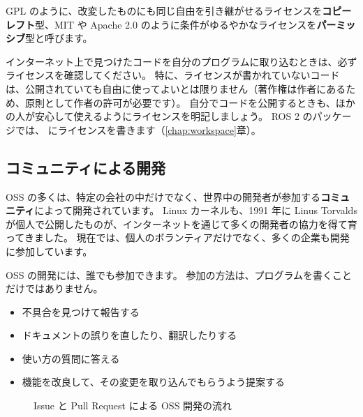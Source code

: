 GPL のように、改変したものにも同じ自由を引き継がせるライセンスを\textbf{コピーレフト}型、MIT や Apache 2.0 のように条件がゆるやかなライセンスを\textbf{パーミッシブ}型と呼びます。

\begin{caution}[他人のコードを使うときはライセンスを確認する]
  インターネット上で見つけたコードを自分のプログラムに取り込むときは、必ずライセンスを確認してください。
  特に、ライセンスが書かれていないコードは、公開されていても自由に使ってよいとは限りません（著作権は作者にあるため、原則として作者の許可が必要です）。
  自分でコードを公開するときも、ほかの人が安心して使えるようにライセンスを明記しましょう。
  ROS 2 のパッケージでは、 にライセンスを書きます（\ref{chap:workspace}章）。
\end{caution}

\subsection{コミュニティによる開発}

OSS の多くは、特定の会社の中だけでなく、世界中の開発者が参加する\textbf{コミュニティ}によって開発されています。
Linux カーネルも、1991 年に Linus Torvalds が個人で公開したものが、インターネットを通じて多くの開発者の協力を得て育ってきました。
現在では、個人のボランティアだけでなく、多くの企業も開発に参加しています。

OSS の開発には、誰でも参加できます。
参加の方法は、プログラムを書くことだけではありません。

\begin{itemize}
  \item 不具合を見つけて報告する
  \item ドキュメントの誤りを直したり、翻訳したりする
  \item 使い方の質問に答える
  \item 機能を改良して、その変更を取り込んでもらうよう提案する
\end{itemize}

\begin{figure}[tb]
  \centering
  \large
  \caption{Issue と Pull Request による OSS 開発の流れ}
  \label{fig:linux-oss-community}
\end{figure}

